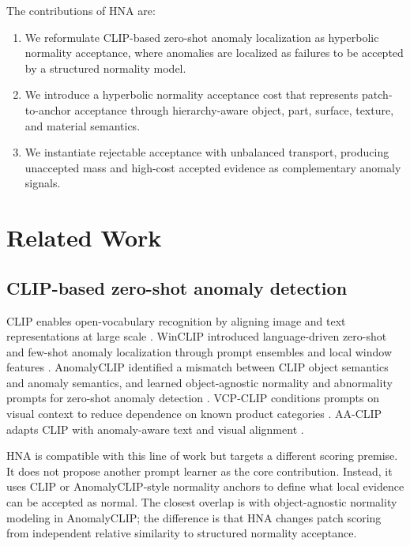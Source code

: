 \documentclass[10pt]{article}
\newcommand{\method}{HNA}
\begin{document}
The contributions of \method{} are:
\begin{enumerate}[leftmargin=*]
    \item We reformulate CLIP-based zero-shot anomaly localization as hyperbolic normality acceptance, where anomalies are localized as failures to be accepted by a structured normality model.
    \item We introduce a hyperbolic normality acceptance cost that represents patch-to-anchor acceptance through hierarchy-aware object, part, surface, texture, and material semantics.
    \item We instantiate rejectable acceptance with unbalanced transport, producing unaccepted mass and high-cost accepted evidence as complementary anomaly signals.
\end{enumerate}

\section{Related Work}

\subsection{CLIP-based zero-shot anomaly detection}

CLIP enables open-vocabulary recognition by aligning image and text representations at large scale \cite{radford2021clip}.
WinCLIP introduced language-driven zero-shot and few-shot anomaly localization through prompt ensembles and local window features \cite{jeong2023winclip}.
AnomalyCLIP identified a mismatch between CLIP object semantics and anomaly semantics, and learned object-agnostic normality and abnormality prompts for zero-shot anomaly detection \cite{zhou2024anomalyclip}.
VCP-CLIP conditions prompts on visual context to reduce dependence on known product categories \cite{qu2024vcpclip}.
AA-CLIP adapts CLIP with anomaly-aware text and visual alignment \cite{ma2025aaclip}.

\method{} is compatible with this line of work but targets a different scoring premise.
It does not propose another prompt learner as the core contribution.
Instead, it uses CLIP or AnomalyCLIP-style normality anchors to define what local evidence can be accepted as normal.
The closest overlap is with object-agnostic normality modeling in AnomalyCLIP; the difference is that \method{} changes patch scoring from independent relative similarity to structured normality acceptance.
\end{document}
